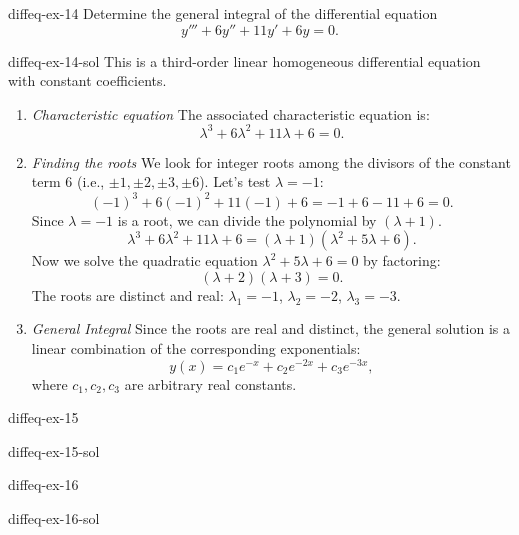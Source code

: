 \documentclass[preview]{standalone}
\begin{document}
\begin{snippetexercise}{diffeq-ex-14}{}
    Determine the general integral of the differential equation
    \[ y''' + 6y'' + 11y' + 6y = 0. \]
\end{snippetexercise}

\begin{snippetsolution}{diffeq-ex-14-sol}{}
    This is a third-order linear homogeneous differential equation with constant coefficients.
    \begin{enumerate}
        \item \emph{Characteristic equation}
        The associated characteristic equation is:
        \[ \lambda^3 + 6\lambda^2 + 11\lambda + 6 = 0. \]
        \item \emph{Finding the roots}
        We look for integer roots among the divisors of the constant term 6 (i.e., \(\pm 1, \pm 2, \pm 3, \pm 6\)).
        Let's test \(\lambda = -1\):
        \[ (-1)^3 + 6(-1)^2 + 11(-1) + 6 = -1 + 6 - 11 + 6 = 0. \]
        Since \(\lambda = -1\) is a root, we can divide the polynomial by \((\lambda + 1)\).
        \[ \lambda^3 + 6\lambda^2 + 11\lambda + 6 = (\lambda + 1)(\lambda^2 + 5\lambda + 6). \]
        Now we solve the quadratic equation \(\lambda^2 + 5\lambda + 6 = 0\) by factoring:
        \[ (\lambda + 2)(\lambda + 3) = 0. \]
        The roots are distinct and real: \(\lambda_1 = -1\), \(\lambda_2 = -2\), \(\lambda_3 = -3\).
        \item \emph{General Integral}
        Since the roots are real and distinct, the general solution is a linear combination of the corresponding exponentials:
        \[ y(x) = c_1 e^{-x} + c_2 e^{-2x} + c_3 e^{-3x}, \]
        where \(c_1, c_2, c_3\) are arbitrary real constants.
    \end{enumerate}
\end{snippetsolution}

\begin{snippetexercise}{diffeq-ex-15}{}
    \todo
\end{snippetexercise}

\begin{snippetsolution}{diffeq-ex-15-sol}{}
    \todo
\end{snippetsolution}

\begin{snippetexercise}{diffeq-ex-16}{}
    \todo
\end{snippetexercise}

\begin{snippetsolution}{diffeq-ex-16-sol}{}
    \todo
\end{snippetsolution}
\end{document}
